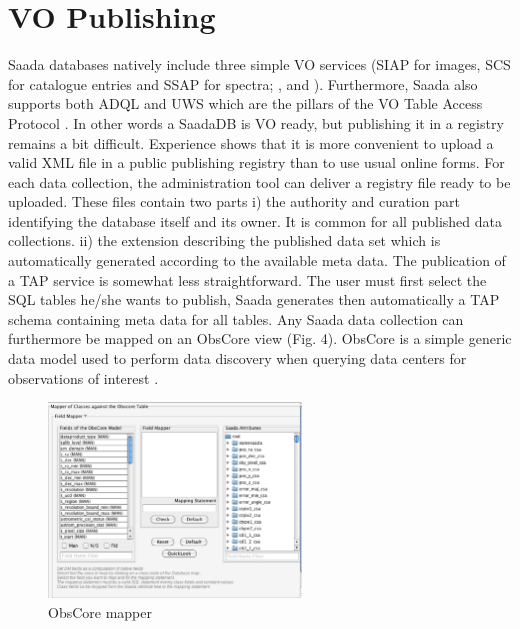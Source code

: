 \section{VO Publishing}
Saada databases natively include three simple VO services (SIAP for images, SCS for catalogue entries and SSAP for spectra; \cite{SIAP} , \cite{SCS} and \cite{SSAP} ). Furthermore, Saada also supports both ADQL \citep{ADQL} and UWS \citep{UWS} which are the pillars of the VO Table Access Protocol \citep{TAP} .
In other words a SaadaDB is VO ready, but publishing it in a registry \citep{REG} remains a bit difficult. Experience shows that it is more convenient to upload a valid XML file in a public publishing registry than to use usual online forms. For each data collection, the administration tool can deliver a registry file ready to be uploaded. These files contain two parts i) the authority and curation part identifying the database itself and its owner. It is common for all published data collections. ii) the extension describing the published data set which is automatically generated according to the available meta data.
The publication of a TAP service is somewhat less straightforward. The user must first select the SQL tables he/she wants to publish, Saada generates then automatically a TAP schema containing meta data for all tables. 
Any Saada data collection can furthermore be mapped on an ObsCore view (Fig. 4). ObsCore  is a simple generic data model used to perform data discovery when querying data centers for observations of interest \citep{OBSCORE}.

\begin{figure}[!h]
	\begin{center}
		\includegraphics[width=0.60\textwidth]{part8/MICHEL_P18/P18_fig4.eps}
	\end{center}
	\caption{ObsCore mapper}
	\label{fig:fig4}
\end{figure}

